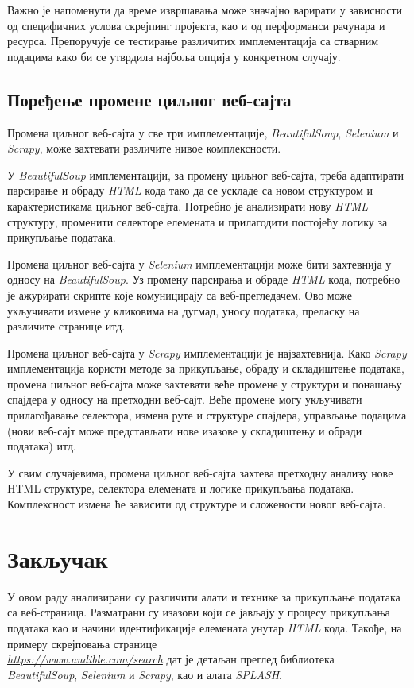 \documentclass[12pt,oneside]{memoir}
\begin{document}
Важно је напоменути да време извршавања може значајно варирати у зависности од специфичних услова скрејпинг пројекта, као и од перформанси рачунара и ресурса. Препоручује се тестирање различитих имплементација са стварним подацима како би се утврдила најбоља опција у конкретном случају.

\section{Поређење промене циљног веб-сајта}
Промена циљног веб-сајта у све три имплементације, \textit{BeautifulSoup}, \textit{Selenium} и \textit{Scrapy}, може захтевати различите нивое комплексности.

У \textit{BeautifulSoup} имплементацији, за промену циљног веб-сајта, треба адаптирати парсирање и обраду \textit{HTML} кода тако да се ускладе са новом структуром и карактеристикама циљног веб-сајта. Потребно је анализирати нову \textit{HTML} структуру, променити селекторе елемената и прилагодити постојећу логику за прикупљање података.

Промена циљног веб-сајта у \textit{Selenium} имплементацији може бити захтевнија у односу на \textit{BeautifulSoup}. Уз промену парсирања и обраде \textit{HTML} кода, потребно је ажурирати скрипте које комуницирају са веб-прегледачем. Ово може укључивати измене у кликовима на дугмад, уносу података, преласку на различите странице итд.

Промена циљног веб-сајта у \textit{Scrapy} имплементацији је најзахтевнија. Како \textit{Scrapy} имплементација користи методе за прикупљање, обраду и складиштење података, промена циљног веб-сајта може захтевати веће промене у структури и понашању спајдера у односу на претходни веб-сајт. Веће промене могу укључивати прилагођавање селектора, измена руте и структуре спајдера, управљање подацима (нови веб-сајт може представљати нове изазове у складиштењу и обради података) итд.

У свим случајевима, промена циљног веб-сајта захтева претходну анализу нове HTML структуре, селектора елемената и логике прикупљања података. Комплексност измена ће зависити од структуре и сложености новог веб-сајта.

\chapter{Закључак}
\label{chp:zakljucak}
У овом раду анализирани су различити алати и технике за прикупљање података са веб-страница. Разматрани су изазови који се јављају у процесу прикупљања података као и начини идентификације елемената унутар \textit{HTML} кода. Такође, на примеру скрејповања странице \\
\textit{\href{https://www.audible.com/search}{https://www.audible.com/search}} дат је детаљан преглед библиотека \textit{Beautiful\-Soup}, \textit{Selenium} и \textit{Scrapy}, као и алата \textit{SPLASH}.
\end{document}
